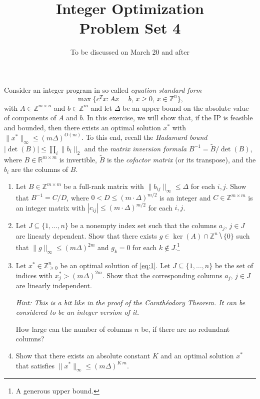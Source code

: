 \documentclass[11pt,a4paper]{article}
\title{Integer Optimization  \\ Problem Set 4 }
\date{To be discussed on March 20 and after}
\newcommand{\wt}[1]{\widetilde{#1}}
\begin{document}
\maketitle 

\noindent 
Consider an integer program in so-called \emph{equation standard form}
  \begin{equation}\label{eq:1}
    \max \{ c^T x : Ax = b, \, x≥0, \, x ∈ ℤ^n\}, 
  \end{equation}
  with $A ∈ℤ^{m ×n}$ and $b∈ℤ^m$ and let $Δ$ be an upper bound on the
  absolute value of components of $A$ and $b$. In this exercise, we
  will show that, if the IP is feasible and bounded, then there exists
  an optimal solution $x^*$ with $\|x^*\|_∞ ≤ (m Δ)^{O(m)}$.  To this end,
  recall the \emph{Hadamard bound } $|\det(B)| ≤ ∏_i \|b_i\|_2$ and
  the \emph{matrix inversion formula} $B^{-1} = \wt{B} / \det(B)$,
  where $B ∈ℝ^{m × m}$ is invertible, $\wt{B}$ is the \emph{cofactor
    matrix} (or its transpose), and the $b_i$ are the columns of $B$.

\begin{enumerate} 
\item Let $B ∈ℤ^{m × m}$ be a full-rank matrix with $\|b_{ij}\|_∞ ≤ Δ$
  for each $i,j$. Show that $B^{-1} = C / D$, where
  $0< D ≤ (m ⋅Δ)^{m/2}$ is an integer and $C ∈ ℤ^{m ×m}$ is an integer
  matrix with $|c_{ij}| ≤ (m ⋅Δ)^{m/2}$ for each $i,j$.
\item Let $J ⊆ \{1,\dots,n\}$ be a nonempty index set such that the
  columns $a_j, \, j ∈ J$ are linearly dependent. Show that there
  exists $g ∈ \ker(A) ∩ ℤ^n ⧹\{0\}$ such that
  $\|g\|_∞ ≤ (m Δ)^{2m}$
  and $g_k = 0$ for each $k ∉ J$.\footnote{A generous upper bound.} 
\item
  Let $x^* ∈ℤ^{n}_{≥0}$ be an optimal solution of \eqref{eq:1}. Let $J ⊆ \{1,\dots,n\}$ be the set of indices  with $x^*_j > (m Δ)^{2m}$. Show that the corresponding columns $a_j, \, j ∈ J$ are linearly independent.

  \emph{Hint: This is a bit like in the proof of the Carathéodory Theorem. It can be considered to be an integer version of it. } 

How large can the number of columns $n$ be, if there are no redundant columns?

\item Show that there exists an absolute constant $K$ and an optimal solution $x^*$ that satisfies  $\|x^*\|_∞ ≤ (m Δ)^{K \, m}$. 
\end{enumerate}

\newpage
\end{document}
